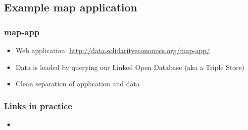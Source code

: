 \subsection{Example map application}
\frame
{
  \frametitle{map-app}
  \begin{itemize}
    \item Web application: \url{http://data.solidarityeconomics.org/map-app/}
    \item Data is loaded by querying our Linked Open Database (aka a Triple Store)
    \item Clean separation of application and data
  \end{itemize}
}
\frame
{
  \frametitle{Links in practice}
  \begin{center}
  \end{center}
  \begin{itemize}
    \item
  \end{itemize}
}



